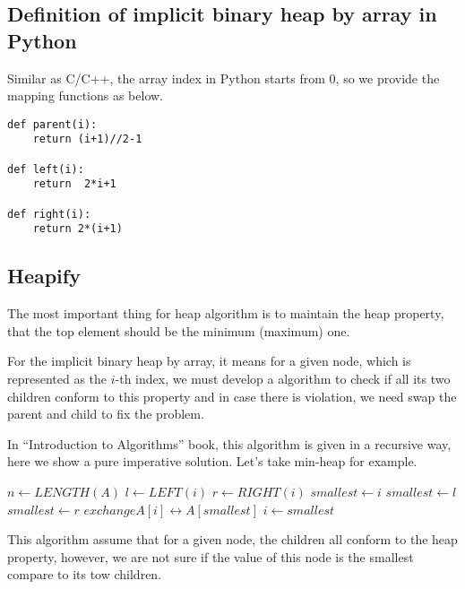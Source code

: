 \documentclass{article}
\begin{document}
\subsection*{Definition of implicit binary heap by array in Python}
Similar as C/C++, the array index in Python starts from 0, so we provide
the mapping functions as below.

\lstset{language=Python}
\begin{lstlisting}
def parent(i):
    return (i+1)//2-1

def left(i):
    return  2*i+1

def right(i):
    return 2*(i+1)
\end{lstlisting}

\subsection{Heapify}

The most important thing for heap algorithm is to maintain the heap
property, that the top element should be the minimum (maximum) one.

For the implicit binary heap by array, it means for a given node,
which is represented as the $i$-th index, we must develop a algorithm
to check if all its two children conform to this property and in case
there is violation, we need swap the parent and child to fix the 
problem. 

In ``Introduction to Algorithms'' book\cite{CLRS}, this algorithm
is given in a recursive way, here we show a pure imperative solution.
Let's take min-heap for example.

\begin{algorithmic}[1]
  \State $n \gets LENGTH(A)$
  \Loop
    \State $l \gets LEFT(i)$
    \State $r \gets RIGHT(i)$
    \State $smallest \gets i$
      \State $smallest \gets l$
    \EndIf
      \State $smallest \gets r$
    \EndIf
      \State $exchange A[i] \leftrightarrow A[smallest]$
      \State $i \gets smallest$
    \Else
      \State \Return
    \EndIf
  \EndLoop
\EndFunction
\end{algorithmic}

This algorithm assume that for a given node, the children all conform 
to the heap property, however, we are not sure if the value of this node 
is the smallest compare to its tow children.
\end{document}
